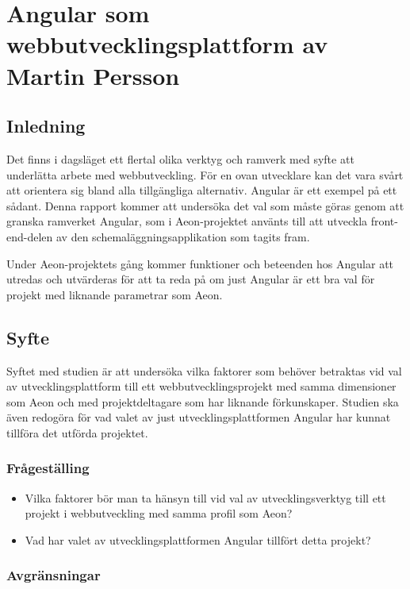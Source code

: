 \chapter{Angular som webbutvecklingsplattform av Martin Persson}

\vspace{1.5em}
\section{Inledning}

Det finns i dagsläget ett flertal olika verktyg och ramverk med syfte att underlätta arbete med webbutveckling. För en ovan utvecklare kan det vara svårt att orientera sig bland alla tillgängliga alternativ. Angular är ett exempel på ett sådant. Denna rapport kommer att undersöka det val som måste göras genom att granska ramverket Angular, som i Aeon-projektet använts till att utveckla front-end-delen av den schemaläggningsapplikation som tagits fram.

Under Aeon-projektets gång kommer funktioner och beteenden hos Angular att utredas och utvärderas för att ta reda på om just Angular är ett bra val för projekt med liknande parametrar som Aeon.

\section{Syfte}

Syftet med studien är att undersöka vilka faktorer som behöver betraktas vid val av utvecklingsplattform till ett webbutvecklingsprojekt med samma dimensioner som Aeon och med projektdeltagare som har liknande förkunskaper. Studien ska även redogöra för vad valet av just utvecklingsplattformen Angular har kunnat tillföra det utförda projektet.

\subsection{Frågeställing}
\begin{itemize}
	\item Vilka faktorer bör man ta hänsyn till vid val av utvecklingsverktyg till ett projekt i webbutveckling med samma profil som Aeon?
	\item Vad har valet av utvecklingsplattformen Angular tillfört detta projekt? 
\end{itemize}

\subsection{Avgränsningar}

